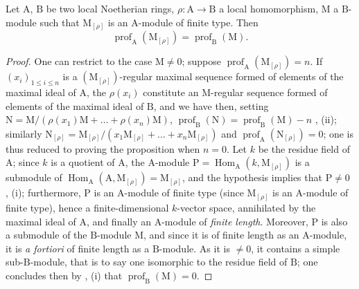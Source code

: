 \begin{proposition}[16.4.8]
\label{0.16.4.8}
Let $\mathrm{A}$, $\mathrm{B}$ be two local Noetherian rings, $\rho:\mathrm{A}\to\mathrm{B}$ a local homomorphism, $\mathrm{M}$ a $\mathrm{B}$-module such that $\mathrm{M}_{[\rho]}$ is an $\mathrm{A}$-module of finite type.
Then
\begin{equation}
\label{0.16.4.8.1}
\tag{16.4.8.1}
  \operatorname{prof}_\mathrm{A}(\mathrm{M}_{[\rho]})=\operatorname{prof}_\mathrm{B}(\mathrm{M}).
\end{equation}
\end{proposition}

\begin{proof}
One can restrict to the case $\mathrm{M}\neq 0$; suppose $\operatorname{prof}_\mathrm{A}(\mathrm{M}_{[\rho]})=n$.
If $(x_i)_{1\leq i\leq n}$ is a $(\mathrm{M}_{[\rho]})$-regular maximal sequence formed of elements of the maximal ideal of $\mathrm{A}$, the $\rho(x_i)$ constitute an $\mathrm{M}$-regular sequence formed of elements of the maximal ideal of $\mathrm{B}$, and we have then, setting $\mathrm{N}=\mathrm{M}/(\rho(x_1)\mathrm{M}+\ldots+\rho(x_n)\mathrm{M})$, $\operatorname{prof}_\mathrm{B}(\mathrm{N})=\operatorname{prof}_\mathrm{B}(\mathrm{M})-n$ , (ii); similarly $\mathrm{N}_{[\rho]}=\mathrm{M}_{[\rho]}/(x_1\mathrm{M}_{[\rho]}+\ldots+x_n\mathrm{M}_{[\rho]})$ and $\operatorname{prof}_\mathrm{A}(\mathrm{N}_{[\rho]})=0$; one is thus reduced to proving the proposition when $n=0$.
Let $k$ be the residue field of $\mathrm{A}$; since $k$ is a quotient of $\mathrm{A}$, the $\mathrm{A}$-module $\mathrm{P}=\operatorname{Hom}_\mathrm{A}(k,\mathrm{M}_{[\rho]})$ is a submodule of $\operatorname{Hom}_\mathrm{A}(\mathrm{A},\mathrm{M}_{[\rho]})=\mathrm{M}_{[\rho]}$, and the hypothesis implies that $\mathrm{P}\neq 0$ , (i); furthermore, $\mathrm{P}$ is an $\mathrm{A}$-module of finite type (since $\mathrm{M}_{[\rho]}$ is an $\mathrm{A}$-module of finite type), hence a finite-dimensional $k$-vector space, annihilated by the maximal ideal of $\mathrm{A}$, and finally an $\mathrm{A}$-module of \emph{finite length}.
Moreover, $\mathrm{P}$ is also a submodule of the $\mathrm{B}$-module $\mathrm{M}$, and since it is of finite length as an $\mathrm{A}$-module, it is \emph{a fortiori} of finite length as a $\mathrm{B}$-module.
As it is $\neq 0$, it contains a simple sub-$\mathrm{B}$-module, that is to say one isomorphic to the residue field of $\mathrm{B}$; one concludes then by , (i) that $\operatorname{prof}_\mathrm{B}(\mathrm{M})=0$.
\end{proof}

